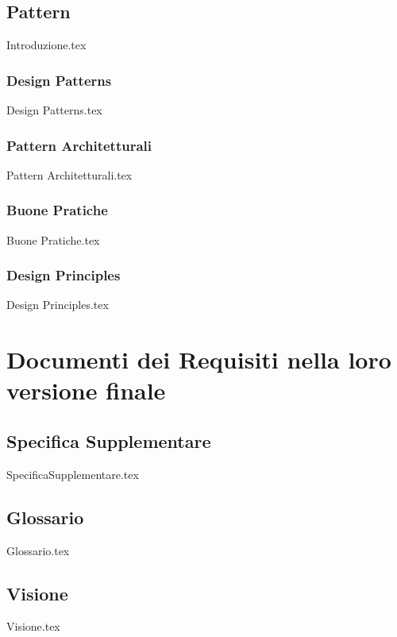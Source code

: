 \documentclass[12pt]{article}
\begin{document}
\subsection{Pattern}
{Introduzione.tex}

\subsubsection{Design Patterns}
{Design Patterns.tex}


\subsubsection{Pattern Architetturali}
{Pattern Architetturali.tex}


\subsubsection{Buone Pratiche}
{Buone Pratiche.tex}

\subsubsection{Design Principles}
{Design Principles.tex}

\section*{\Huge \textbf{Documenti dei Requisiti nella loro versione finale}}
\setcounter{subsection}{0} 
\renewcommand{\thesubsection}{\arabic{subsection}} 

\subsection{Specifica Supplementare}
{SpecificaSupplementare.tex}

\subsection{Glossario}
{Glossario.tex}

\subsection{Visione}
{Visione.tex}
\end{document}
